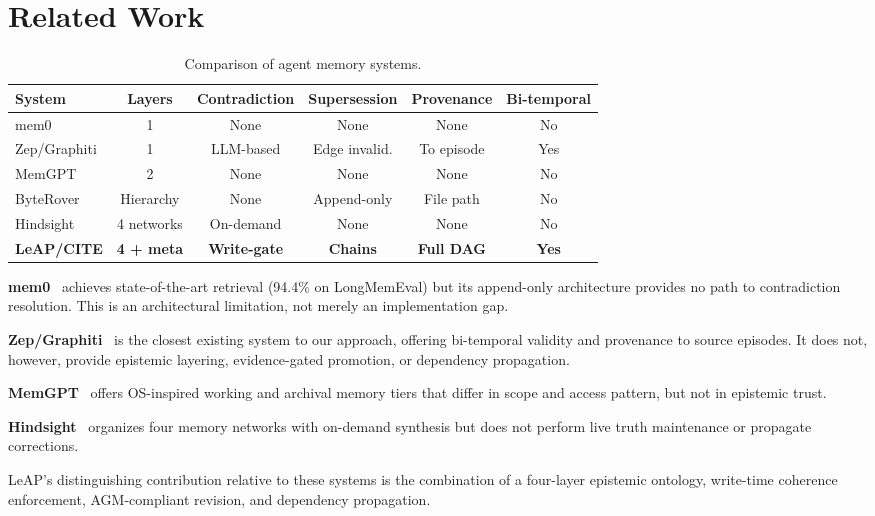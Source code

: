 \documentclass[11pt,letterpaper]{article}
\begin{document}
\section{Related Work}

\begin{table}[H]
\centering
\caption{Comparison of agent memory systems.}
\label{tab:comparison}
\begin{tabular}{@{}lccccc@{}}
\toprule
\textbf{System} & \textbf{Layers} & \textbf{Contradiction} & \textbf{Supersession} & \textbf{Provenance} & \textbf{Bi-temporal} \\
\midrule
mem0 & 1 & None & None & None & No \\
Zep/Graphiti & 1 & LLM-based & Edge invalid. & To episode & Yes \\
MemGPT & 2 & None & None & None & No \\
ByteRover & Hierarchy & None & Append-only & File path & No \\
Hindsight & 4 networks & On-demand & None & None & No \\
\textbf{LeAP/CITE} & \textbf{4 + meta} & \textbf{Write-gate} & \textbf{Chains} & \textbf{Full DAG} & \textbf{Yes} \\
\bottomrule
\end{tabular}
\end{table}

\textbf{mem0}~\cite{mem0} achieves state-of-the-art retrieval (94.4\% on LongMemEval) but its append-only architecture provides no path to contradiction resolution. This is an architectural limitation, not merely an implementation gap.

\textbf{Zep/Graphiti}~\cite{graphiti2025} is the closest existing system to our approach, offering bi-temporal validity and provenance to source episodes. It does not, however, provide epistemic layering, evidence-gated promotion, or dependency propagation.

\textbf{MemGPT}~\cite{memgpt2023} offers OS-inspired working and archival memory tiers that differ in scope and access pattern, but not in epistemic trust.

\textbf{Hindsight}~\cite{hindsight} organizes four memory networks with on-demand synthesis but does not perform live truth maintenance or propagate corrections.

LeAP's distinguishing contribution relative to these systems is the combination of a four-layer epistemic ontology, write-time coherence enforcement, AGM-compliant revision, and dependency propagation.
\end{document}
